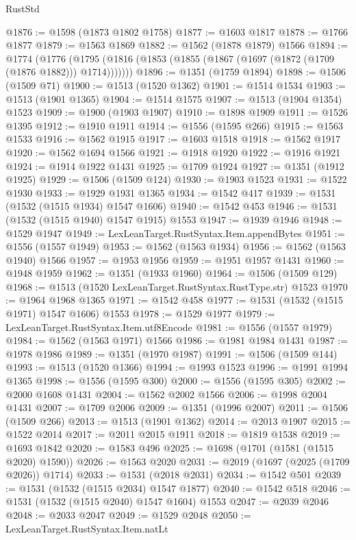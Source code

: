 \begin{lexlean}{RustStd}
\begin{coremodule}
{\begin{coremodule}
{{{{{{{{{{{{{{{{{{{{{{{{{{{{{{{{@1876 := @1598 (@1873 @1802 @1758)
@1877 := @1603 @1817
@1878 := @1766 @1877
@1879 := @1563 @1869
@1882 := @1562 (@1878 @1879) @1566
@1894 := @1774
    (@1776 (@1795 (@1816 (@1853 (@1855 (@1867 (@1697 (@1872 (@1709 (@1876 @1882))) @1714)))))))
@1896 := @1351 (@1759 @1894)
@1898 := @1506 (@1509 @71)
@1900 := @1513 (@1520 @1362)
@1901 := @1514 @1534
@1903 := @1513 (@1901 @1365)
@1904 := @1514 @1575
@1907 := @1513 (@1904 @1354) @1523
@1909 := @1900 (@1903 @1907)
@1910 := @1898 @1909
@1911 := @1526 @1395
@1912 := @1910 @1911
@1914 := @1556 (@1595 @266)
@1915 := @1563 @1533
@1916 := @1562 @1915
@1917 := @1603 @1518
@1918 := @1562 @1917
@1920 := @1562 @1694 @1566
@1921 := @1918 @1920
@1922 := @1916 @1921
@1924 := @1914 @1922 @1431
@1925 := @1709 @1924
@1927 := @1351 (@1912 @1925)
@1929 := @1506 (@1509 @124)
@1930 := @1903 @1523
@1931 := @1522 @1930
@1933 := @1929 @1931 @1365
@1934 := @1542 @417
@1939 := @1531 (@1532 (@1515 @1934) @1547 @1606)
@1940 := @1542 @453
@1946 := @1531 (@1532 (@1515 @1940) @1547 @1915) @1553
@1947 := @1939 @1946
@1948 := @1529 @1947
@1949 := LexLeanTarget.RustSyntax.Item.appendBytes
@1951 := @1556 (@1557 @1949)
@1953 := @1562 (@1563 @1934)
@1956 := @1562 (@1563 @1940) @1566
@1957 := @1953 @1956
@1959 := @1951 @1957 @1431
@1960 := @1948 @1959
@1962 := @1351 (@1933 @1960)
@1964 := @1506 (@1509 @129)
@1968 := @1513 (@1520 LexLeanTarget.RustSyntax.RustType.str) @1523
@1970 := @1964 @1968 @1365
@1971 := @1542 @458
@1977 := @1531 (@1532 (@1515 @1971) @1547 @1606) @1553
@1978 := @1529 @1977
@1979 := LexLeanTarget.RustSyntax.Item.utf8Encode
@1981 := @1556 (@1557 @1979)
@1984 := @1562 (@1563 @1971) @1566
@1986 := @1981 @1984 @1431
@1987 := @1978 @1986
@1989 := @1351 (@1970 @1987)
@1991 := @1506 (@1509 @144)
@1993 := @1513 (@1520 @1366)
@1994 := @1993 @1523
@1996 := @1991 @1994 @1365
@1998 := @1556 (@1595 @300)
@2000 := @1556 (@1595 @305)
@2002 := @2000 @1608 @1431
@2004 := @1562 @2002 @1566
@2006 := @1998 @2004 @1431
@2007 := @1709 @2006
@2009 := @1351 (@1996 @2007)
@2011 := @1506 (@1509 @266)
@2013 := @1513 (@1901 @1362)
@2014 := @2013 @1907
@2015 := @1522 @2014
@2017 := @2011 @2015 @1911
@2018 := @1819 @1538
@2019 := @1693 @1842
@2020 := @1583 @496
@2025 := @1698 (@1701 (@1581 (@1515 @2020) @1590))
@2026 := @1563 @2020
@2031 := @2019 (@1697 (@2025 (@1709 @2026)) @1714)
@2033 := @1531 (@2018 @2031)
@2034 := @1542 @501
@2039 := @1531 (@1532 (@1515 @2034) @1547 @1877)
@2040 := @1542 @518
@2046 := @1531 (@1532 (@1515 @2040) @1547 @1604) @1553
@2047 := @2039 @2046
@2048 := @2033 @2047
@2049 := @1529 @2048
@2050 := LexLeanTarget.RustSyntax.Item.natLt
}}}}}}}}}}}}}}}}}}}}}}}}}}}}}}}}
\end{coremodule}}
\end{coremodule}
\end{lexlean}
